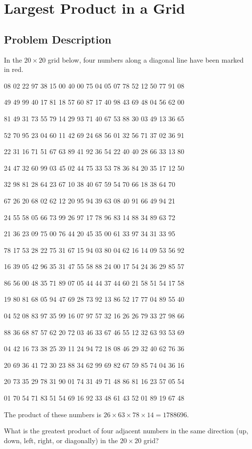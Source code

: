 \chapter{Largest Product in a Grid}
\section{Problem Description}
In the $20 \times 20$
 grid below, four numbers along a diagonal line have been marked in red.

 \begin{center}
08 02 22 97 38 15 00 40 00 75 04 05 07 78 52 12 50 77 91 08

49 49 99 40 17 81 18 57 60 87 17 40 98 43 69 48 04 56 62 00

81 49 31 73 55 79 14 29 93 71 40 67 53 88 30 03 49 13 36 65

52 70 95 23 04 60 11 42 69 24 68 56 01 32 56 71 37 02 36 91

22 31 16 71 51 67 63 89 41 92 36 54 22 40 40 28 66 33 13 80

24 47 32 60 99 03 45 02 44 75 33 53 78 36 84 20 35 17 12 50

32 98 81 28 64 23 67 10 {\color{red!80!black}{26}} 38 40 67 59 54 70 66 18 38 64 70

67 26 20 68 02 62 12 20 95 {\color{red!80!black}{63}} 94 39 63 08 40 91 66 49 94 21

24 55 58 05 66 73 99 26 97 17 {\color{red!80!black}{78}} 78 96 83 14 88 34 89 63 72

21 36 23 09 75 00 76 44 20 45 35 {\color{red!80!black}{14}} 00 61 33 97 34 31 33 95

78 17 53 28 22 75 31 67 15 94 03 80 04 62 16 14 09 53 56 92

16 39 05 42 96 35 31 47 55 58 88 24 00 17 54 24 36 29 85 57

86 56 00 48 35 71 89 07 05 44 44 37 44 60 21 58 51 54 17 58

19 80 81 68 05 94 47 69 28 73 92 13 86 52 17 77 04 89 55 40

04 52 08 83 97 35 99 16 07 97 57 32 16 26 26 79 33 27 98 66

88 36 68 87 57 62 20 72 03 46 33 67 46 55 12 32 63 93 53 69

04 42 16 73 38 25 39 11 24 94 72 18 08 46 29 32 40 62 76 36

20 69 36 41 72 30 23 88 34 62 99 69 82 67 59 85 74 04 36 16

20 73 35 29 78 31 90 01 74 31 49 71 48 86 81 16 23 57 05 54

01 70 54 71 83 51 54 69 16 92 33 48 61 43 52 01 89 19 67 48

\end{center}

The product of these numbers is $26 \times 63 \times 78 \times 14 = 1788696$.

What is the greatest product of four adjacent numbers in the same direction (up, down, left, right, or diagonally) in
the $20 \times 20$ grid?
